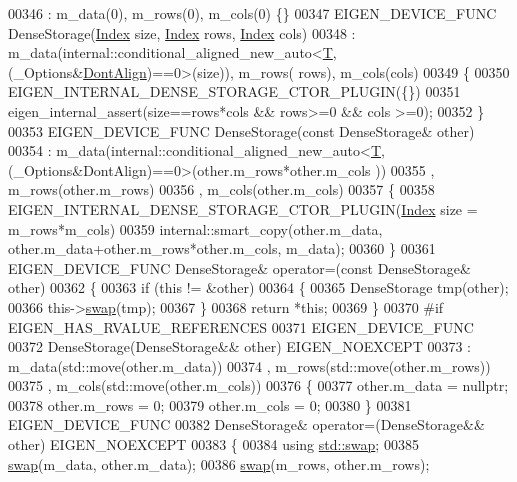 \begin{DoxyCode}
00346        : m\_data(0), m\_rows(0), m\_cols(0) \{\}
00347     EIGEN\_DEVICE\_FUNC DenseStorage(\hyperlink{namespace_eigen_a62e77e0933482dafde8fe197d9a2cfde}{Index} size, \hyperlink{namespace_eigen_a62e77e0933482dafde8fe197d9a2cfde}{Index} rows, \hyperlink{namespace_eigen_a62e77e0933482dafde8fe197d9a2cfde}{Index} cols)
00348       : m\_data(internal::conditional\_aligned\_new\_auto<\hyperlink{group___sparse_core___module}{T},(\_Options&\hyperlink{group__enums_ggaacded1a18ae58b0f554751f6cdf9eb13a40a452614141522dd313363dbbd65726}{DontAlign})==0>(size)), m\_rows(
      rows), m\_cols(cols)
00349     \{
00350       EIGEN\_INTERNAL\_DENSE\_STORAGE\_CTOR\_PLUGIN(\{\})
00351       eigen\_internal\_assert(size==rows*cols && rows>=0 && cols >=0);
00352     \}
00353     EIGEN\_DEVICE\_FUNC DenseStorage(\textcolor{keyword}{const} DenseStorage& other)
00354       : m\_data(internal::conditional\_aligned\_new\_auto<\hyperlink{group___sparse_core___module}{T},(\_Options&DontAlign)==0>(other.m\_rows*other.m\_cols
      ))
00355       , m\_rows(other.m\_rows)
00356       , m\_cols(other.m\_cols)
00357     \{
00358       EIGEN\_INTERNAL\_DENSE\_STORAGE\_CTOR\_PLUGIN(\hyperlink{namespace_eigen_a62e77e0933482dafde8fe197d9a2cfde}{Index} size = m\_rows*m\_cols)
00359       internal::smart\_copy(other.m\_data, other.m\_data+other.m\_rows*other.m\_cols, m\_data);
00360     \}
00361     EIGEN\_DEVICE\_FUNC DenseStorage& operator=(\textcolor{keyword}{const} DenseStorage& other)
00362     \{
00363       \textcolor{keywordflow}{if} (\textcolor{keyword}{this} != &other)
00364       \{
00365         DenseStorage tmp(other);
00366         this->\hyperlink{endian_8c_a3ca5ecd34b04d6a243c054ac3a57f68d}{swap}(tmp);
00367       \}
00368       \textcolor{keywordflow}{return} *\textcolor{keyword}{this};
00369     \}
00370 \textcolor{preprocessor}{#if EIGEN\_HAS\_RVALUE\_REFERENCES}
00371     EIGEN\_DEVICE\_FUNC
00372     DenseStorage(DenseStorage&& other) EIGEN\_NOEXCEPT
00373       : m\_data(std::move(other.m\_data))
00374       , m\_rows(std::move(other.m\_rows))
00375       , m\_cols(std::move(other.m\_cols))
00376     \{
00377       other.m\_data = \textcolor{keyword}{nullptr};
00378       other.m\_rows = 0;
00379       other.m\_cols = 0;
00380     \}
00381     EIGEN\_DEVICE\_FUNC
00382     DenseStorage& operator=(DenseStorage&& other) EIGEN\_NOEXCEPT
00383     \{
00384       \textcolor{keyword}{using} \hyperlink{endian_8c_a3ca5ecd34b04d6a243c054ac3a57f68d}{std::swap};
00385       \hyperlink{endian_8c_a3ca5ecd34b04d6a243c054ac3a57f68d}{swap}(m\_data, other.m\_data);
00386       \hyperlink{endian_8c_a3ca5ecd34b04d6a243c054ac3a57f68d}{swap}(m\_rows, other.m\_rows);

\end{DoxyCode}
